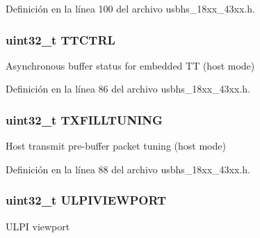 Definición en la línea 100 del archivo usbhs\+\_\+18xx\+\_\+43xx.\+h.

\subsubsection[{\texorpdfstring{T\+T\+C\+T\+RL}{TTCTRL}}]{ uint32\+\_\+t T\+T\+C\+T\+RL}\hypertarget{struct_l_p_c___u_s_b_h_s___t_a1c8a382a4d6ca96899df6d1979cd9637}{}\label{struct_l_p_c___u_s_b_h_s___t_a1c8a382a4d6ca96899df6d1979cd9637}
Asynchronous buffer status for embedded TT (host mode) 

Definición en la línea 86 del archivo usbhs\+\_\+18xx\+\_\+43xx.\+h.

\subsubsection[{\texorpdfstring{T\+X\+F\+I\+L\+L\+T\+U\+N\+I\+NG}{TXFILLTUNING}}]{ uint32\+\_\+t T\+X\+F\+I\+L\+L\+T\+U\+N\+I\+NG}\hypertarget{struct_l_p_c___u_s_b_h_s___t_a3c352ffa30d3a84981a1dead4eca34fa}{}\label{struct_l_p_c___u_s_b_h_s___t_a3c352ffa30d3a84981a1dead4eca34fa}
Host transmit pre-\/buffer packet tuning (host mode) 

Definición en la línea 88 del archivo usbhs\+\_\+18xx\+\_\+43xx.\+h.

\subsubsection[{\texorpdfstring{U\+L\+P\+I\+V\+I\+E\+W\+P\+O\+RT}{ULPIVIEWPORT}}]{ uint32\+\_\+t U\+L\+P\+I\+V\+I\+E\+W\+P\+O\+RT}\hypertarget{struct_l_p_c___u_s_b_h_s___t_ac6b9be3c87326d058790a7e5c38c9f41}{}\label{struct_l_p_c___u_s_b_h_s___t_ac6b9be3c87326d058790a7e5c38c9f41}
U\+L\+PI viewport 

